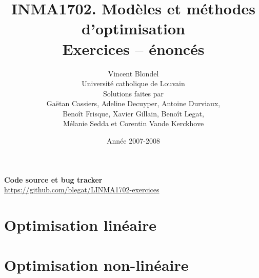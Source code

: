 \documentclass[11pt]{article}
\author{Vincent Blondel\\
Université catholique de Louvain\\
Solutions faites par\\
Gaëtan Cassiers, Adeline Decuyper, Antoine Durviaux,\\
Benoît Frisque, Xavier Gillain, Benoît Legat,\\
Mélanie Sedda et Corentin Vande Kerckhove}
\title{INMA1702. Mod\`eles et m\'ethodes d'optimisation
  \\
Exercices -- énoncés \ifthenelse{\equal{\Sol}{true}}{et solutions}}
\begin{document}
\date{Année 2007-2008}

\maketitle

\begin{center}
\textbf{Code source et bug tracker}\\
\url{https://github.com/blegat/LINMA1702-exercices}
\end{center}

\newpage


\tableofcontents

\newpage

\part{Optimisation linéaire}


\newpage


\newpage


\newpage


\newpage


\newpage


\newpage


\newpage

\part{Optimisation non-linéaire}


\newpage


\newpage


\newpage


\end{document}
